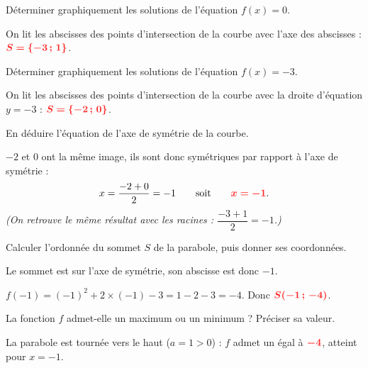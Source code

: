 \documentclass[11pt,a4paper]{book}
\begin{document}
\begin{enumMet}
	\item Déterminer graphiquement les solutions de l'équation $f(x)=0$.

	\begin{corrBox}
		On lit les abscisses des points d'intersection de la courbe avec l'axe des abscisses : $\mRouge{S=\{-3\,;\,1\}}$.
	\end{corrBox}

	\item Déterminer graphiquement les solutions de l'équation $f(x)=-3$.

	\begin{corrBox}
		On lit les abscisses des points d'intersection de la courbe avec la droite d'équation $y=-3$ : $\mRouge{S=\{-2\,;\,0\}}$.
	\end{corrBox}

	\item En déduire l'équation de l'axe de symétrie de la courbe.

	\begin{corrBox}
		$-2$ et $0$ ont la même image, ils sont donc symétriques par rapport à l'axe de symétrie :
		\[x=\dfrac{-2+0}{2}=-1 \qquad \text{soit} \qquad \mRouge{x=-1}.\]
		\emph{(On retrouve le même résultat avec les racines : $\dfrac{-3+1}{2}=-1$.)}
	\end{corrBox}

	\item Calculer l'ordonnée du sommet $S$ de la parabole, puis donner ses coordonnées.

	\begin{corrBox}
		Le sommet est sur l'axe de symétrie, son abscisse est donc $-1$.

		$f(-1)=(-1)^2+2\times(-1)-3=1-2-3=-4$. \qquad Donc $\mRouge{S(-1\,;\,-4)}$.
	\end{corrBox}

	\item La fonction $f$ admet-elle un maximum ou un minimum ? Préciser sa valeur.

	\begin{corrBox}
		La parabole est tournée vers le haut ($a=1>0$) : $f$ admet un  égal à $\mRouge{-4}$, atteint pour $x=-1$.
	\end{corrBox}
\end{enumMet}

\newpage

\exerciceDS{}
\end{document}
